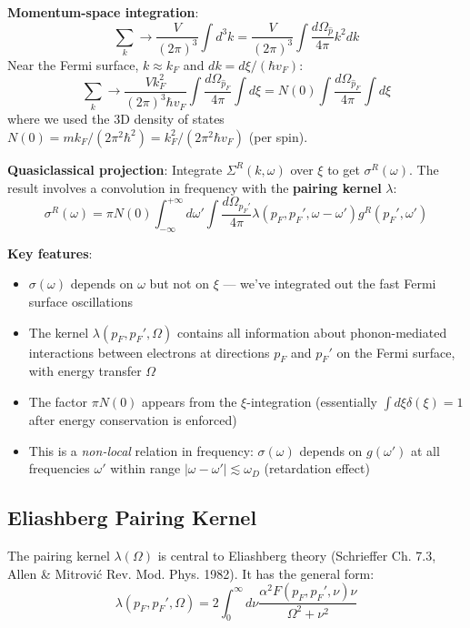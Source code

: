\documentclass[12pt]{article}
\begin{document}
\textbf{Momentum-space integration}:
\begin{equation}
\sum_k \to \frac{V}{(2\pi)^3} \int d^3k = \frac{V}{(2\pi)^3} \int \frac{d\Omega_{\hat{p}}}{4\pi} k^2 dk
\end{equation}
Near the Fermi surface, $k \approx k_F$ and $dk = d\xi/(\hbar v_F)$:
\begin{equation}
\sum_k \to \frac{V k_F^2}{(2\pi)^3\hbar v_F} \int \frac{d\Omega_{\hat{p}_F}}{4\pi} \int d\xi = N(0) \int \frac{d\Omega_{\hat{p}_F}}{4\pi} \int d\xi
\end{equation}
where we used the 3D density of states $N(0) = m k_F/(2\pi^2\hbar^2) = k_F^2/(2\pi^2\hbar v_F)$ (per spin).

\textbf{Quasiclassical projection}: Integrate $\Sigma^R(k,\omega)$ over $\xi$ to get $\sigma^R(\omega)$. The result involves a convolution in frequency with the \textbf{pairing kernel} $\lambda$:
\begin{equation}
\boxed{
\sigma^R(\omega) = \pi N(0) \int_{-\infty}^{+\infty} d\omega' \int \frac{d\Omega_{p_F'}}{4\pi} \lambda(p_F, p_F', \omega - \omega') g^R(p_F', \omega')
}
\end{equation}

\textbf{Key features}:
\begin{itemize}
\item $\sigma(\omega)$ depends on $\omega$ but not on $\xi$ — we've integrated out the fast Fermi surface oscillations
\item The kernel $\lambda(p_F, p_F', \Omega)$ contains all information about phonon-mediated interactions between electrons at directions $p_F$ and $p_F'$ on the Fermi surface, with energy transfer $\Omega$
\item The factor $\pi N(0)$ appears from the $\xi$-integration (essentially $\int d\xi \delta(\xi) = 1$ after energy conservation is enforced)
\item This is a \textit{non-local} relation in frequency: $\sigma(\omega)$ depends on $g(\omega')$ at all frequencies $\omega'$ within range $|\omega - \omega'| \lesssim \omega_D$ (retardation effect)
\end{itemize}

\subsection{Eliashberg Pairing Kernel}

The pairing kernel $\lambda(\Omega)$ is central to Eliashberg theory (Schrieffer Ch. 7.3, Allen \& Mitrović Rev. Mod. Phys. 1982). It has the general form:
\begin{equation}
\boxed{
\lambda(p_F, p_F', \Omega) = 2\int_0^{\infty} d\nu \frac{\alpha^2F(p_F, p_F', \nu) \nu}{\Omega^2 + \nu^2}
}
\end{equation}
\end{document}
